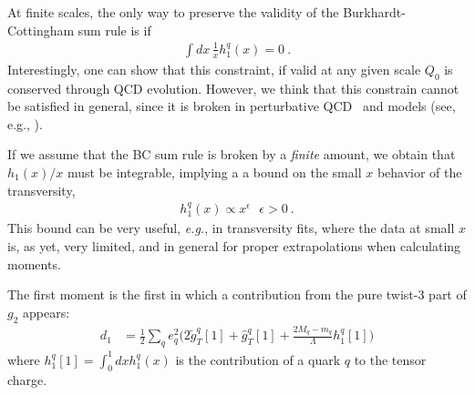 \documentclass[preprintnumbers,floatfix,nofootinbib]{revtex4}
\newcommand{\eg}{{\em e.g.}}
\begin{document}
At finite scales, the only way to preserve the validity of the
Burkhardt-Cottingham sum rule is if
\begin{align}
   \int dx\, \frac{1}{x} h_1^q(x) = 0 \ .
\label{eq:ABsumrule}
\end{align}
Interestingly, one can show that this constraint, if valid at any given scale
$Q_0$ is conserved through QCD evolution. However, we think that this
constrain cannot be satisfied in general, since it is broken in perturbative
QCD~\cite{Kundu:2001pk} and models (see, e.g., \cite{Schweitzer:2001sr,Wakamatsu:2007nc,Pasquini:2005dk,Cloet:2007em,Bacchetta:2008af,Bourrely:2010ng}).


If we assume that the BC sum rule is broken by a {\em finite} amount, we
obtain that $h_1(x)/x$ must be integrable, implying a 
a bound on the small $x$ behavior of the transversity, 
\begin{align}
  h_1^q(x) \propto x^\epsilon \ \ \ \epsilon>0 \ .
\label{eq:ABbound}
\end{align}
This bound can be very useful, \eg, in transversity fits, where the data at
small $x$ is, as yet, very limited, and in general for proper extrapolations
when calculating moments. 

The first moment is the first in which a contribution from the pure twist-3 part of $g_2$ appears:
\begin{align}
  d_1 & = \frac12 \sum_q e_q^2 \bigg( 2 \tilde g_T^q[1] + \hat g_T^q[1]
    + \frac{2M_q-m_q}{\Lambda} h_1^q[1] \bigg)
\end{align}
where $h_1^q[1] = \int_0^1 dx h_1^q(x)$ is the contribution of a quark $q$ to the tensor charge. 
\end{document}
